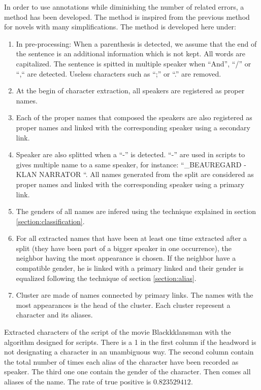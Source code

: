 \documentclass[a4paper, 12pt]{report}
\begin{document}
In order to use annotations while diminishing the number of related errors, a method has been developed. 
The method is inspired from the previous method for novels with many simplifications. The method is developed here under:
\begin{enumerate}
\item In pre-processing: When a parenthesis is detected, we assume that the end of the sentence is an additional information which is not kept. All words are capitalized. The sentence is spitted in multiple speaker when ``And'', ``/''  or ``,`` are detected.   Useless characters such as ``;'' or ``.'' are removed.
\item At the begin of character extraction, all speakers are registered as proper names.
\item Each of the proper names that composed the speakers are also registered as proper names and linked with the corresponding speaker using a secondary link.
\item Speaker are also splitted when a ``-'' is detected. ``-'' are used in scripts to gives multiple name to a same speaker, for instance: ``_BEAUREGARD - KLAN NARRATOR ``. 
All names generated from the split are considered as proper names and linked with the corresponding speaker using a primary link.
\item The genders of all names are infered using the technique explained in section \ref{section:classification}.
\item For all extracted names that have been at least one time extracted after a split (they have been part of a bigger speaker in one occurrence), the  neighbor having the most appearance is chosen. If the neighbor have a compatible gender, he is linked with a primary linked and their gender is equalized following the technique of section \ref{section:alias}.
\item Cluster are made of names connected by primary links. The names with the most appearances is the head of the cluster. Each cluster represent a character and its aliases.
\end{enumerate}


\begin{table}[]
\caption{Extracted characters of the script of the movie Blackkklansman with the algorithm designed for scripts. 
There is a 1 in the first column if the headword is not designating a character in an unambiguous way. 
The second column contain the total number of times each alias of the character have been recorded as speaker. 
The third one one contain the gender of the character. Then comes all aliases of the name. The rate of true positive is $0.823529412$.}
 \label{character_bkm}
\end{table}
\end{document}

